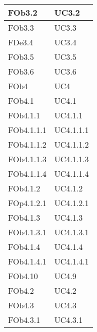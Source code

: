 \begin{longtable}{|l|p{4cm}|}
\hline
FOb3.2 & UC3.2 \linebreak  \\ 
\hline
FOb3.3 & UC3.3 \linebreak  \\ 
\hline
FDe3.4 & UC3.4 \linebreak  \\ 
\hline
FOb3.5 & UC3.5 \linebreak  \\ 
\hline
FOb3.6 & UC3.6 \linebreak  \\ 
\hline
FOb4 & UC4 \linebreak \\ 
\hline
FOb4.1 & UC4.1 \linebreak  \\ 
\hline
FOb4.1.1 & UC4.1.1 \linebreak  \\ 
\hline
FOb4.1.1.1 & UC4.1.1.1 \linebreak  \\ 
\hline
FOb4.1.1.2 & UC4.1.1.2 \linebreak  \\ 
\hline
FOb4.1.1.3 & UC4.1.1.3 \linebreak  \\ 
\hline
FOb4.1.1.4 & UC4.1.1.4 \linebreak  \\ 
\hline
FOb4.1.2 & UC4.1.2 \linebreak  \\ 
\hline
FOp4.1.2.1 & UC4.1.2.1 \linebreak  \\ 
\hline
FOb4.1.3 & UC4.1.3 \linebreak  \\ 
\hline
FOb4.1.3.1 & UC4.1.3.1 \linebreak  \\ 
\hline
FOb4.1.4 & UC4.1.4 \linebreak  \\ 
\hline
FOb4.1.4.1 & UC4.1.4.1 \linebreak  \\ 
\hline
FOb4.10 & UC4.9 \linebreak  \\ 
\hline
FOb4.2 & UC4.2 \linebreak  \\ 
\hline
FOb4.3 & UC4.3 \linebreak  \\ 
\hline
FOb4.3.1 & UC4.3.1 \linebreak  \\ 

\end{longtable}
